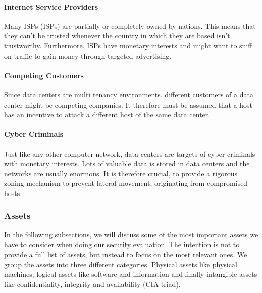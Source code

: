 \paragraph{Internet Service Providers} Many \acsp{ISP} (\aclp{ISP}) are partially or completely owned by nations. This means that they can't be trusted whenever the country in which they are based isn't trustworthy. Furthermore, \acsp{ISP} have monetary interests and might want to sniff on traffic to gain money through targeted advertising.

\paragraph{Competing Customers} Since data centers are multi tenancy environments, different customers of a data center might be competing companies. It therefore must be assumed that a host has an incentive to attack a different host of the same data center.  


\paragraph{Cyber Criminals} Just like any other computer network, data centers are targets of cyber criminals with monetary interests. Lots of valuable data is stored in data centers and the networks are usually enormous. It is therefore crucial, to provide a rigorous zoning mechanism to prevent lateral movement, originating from compromised hosts

\subsubsection{Assets}
In the following subsections, we will discuss some of the most important assets we have to consider when doing our security evaluation. The intention is not to provide a full list of assets, but instead to focus on the most relevant ones. We group the assets into three different categories. Physical assets like physical machines, logical assets like software and information and finally intangible assets like confidentiality, integrity and availability (CIA triad).
